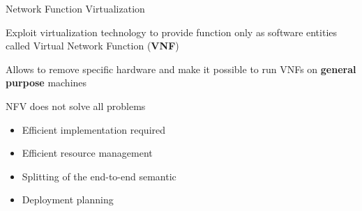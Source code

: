 \begin{frame}{Network Function Virtualization}

  Exploit virtualization technology to provide function only as
  software entities called Virtual Network Function (\textbf{VNF})

  \vfill{}

  Allows to remove specific hardware and make it possible to run VNFs on
  \textbf{general purpose} machines

  \vfill{}

  NFV does not solve all problems
  \begin{itemize}
    \item Efficient implementation required
    \item Efficient resource management
    \item Splitting of the end-to-end semantic
    \item Deployment planning
  \end{itemize}

  \vfill{}

\end{frame}